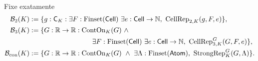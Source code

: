 \begin{definicao}\label{map:normalizacao:5.3}\label{normalizacao:def:threeclasses}
Fixe exatamente
\begin{align*}
 \mathcal B_2(K)&:=
 \{g:\CK:\exists F:\FS(\Cell)\ \exists e:\Cell\to\N,\
                  \operatorname{CellRep}_{2,K}(g,F,e)\},\\
 \mathcal B_3(K)&:=
 \{G:\R\to\R:\operatorname{ContOn}_K(G)\ \land\\
 &\hspace{32mm}\exists F:\FS(\Cell)\ \exists e:\Cell\to\N,\
                   \operatorname{CellRep}^G_{3,K}(G,F,e)\},\\
 \mathcal B_{\rm con}(K)&:=
 \{G:\R\to\R:\operatorname{ContOn}_K(G)\ \land\
                  \exists\Lambda:\FS(\Atoms),\ \Str^G_K(G,\Lambda)\}.
\end{align*}
\end{definicao}

